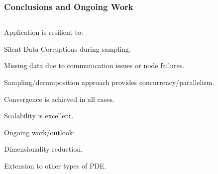 

\begin{frame}
\frametitle{Conclusions and Ongoing Work}
%
\begin{columns}
\begin{column}{1.1\textwidth}
\bi
\item Application is resilient to:
  \bi
  \item Silent Data Corruptions during sampling.
  \item Missing data due to communication issues or node failures.
  \ei
  \mmk
\item Sampling/decomposition approach provides concurrency/parallelism.
\mmk
\item Convergence is achieved in all cases.
\mmk
\item Scalability is excellent.
\mmk
\item Ongoing work/outlook:
  \bi
  \item Dimensionality reduction.
  \ssk
  \item Extension to other types of PDE.
  \ei
\ei
%
\end{column}
\end{columns}
%
\end{frame}










